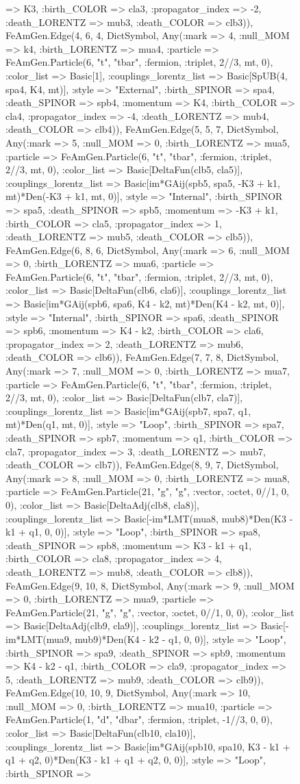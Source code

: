\documentclass{revtex4}
\begin{document}
\begin{figure}[!htb]
\begin{center}
{=> K3, :birth_COLOR => cla3, :propagator_index => -2, :death_LORENTZ => mub3, :death_COLOR => clb3)), FeAmGen.Edge(4, 6, 4, Dict{Symbol, Any}(:mark => 4, :null_MOM => k4, :birth_LORENTZ => mua4, :particle => FeAmGen.Particle(6, "t", "tbar", :fermion, :triplet, 2//3, mt, 0), :color_list => Basic[1], :couplings_lorentz_list => Basic[SpUB(4, spa4, K4, mt)], :style => "External", :birth_SPINOR => spa4, :death_SPINOR => spb4, :momentum => K4, :birth_COLOR => cla4, :propagator_index => -4, :death_LORENTZ => mub4, :death_COLOR => clb4)), FeAmGen.Edge(5, 5, 7, Dict{Symbol, Any}(:mark => 5, :null_MOM => 0, :birth_LORENTZ => mua5, :particle => FeAmGen.Particle(6, "t", "tbar", :fermion, :triplet, 2//3, mt, 0), :color_list => Basic[DeltaFun(clb5, cla5)], :couplings_lorentz_list => Basic[im*GAij(spb5, spa5, -K3 + k1, mt)*Den(-K3 + k1, mt, 0)], :style => "Internal", :birth_SPINOR => spa5, :death_SPINOR => spb5, :momentum => -K3 + k1, :birth_COLOR => cla5, :propagator_index => 1, :death_LORENTZ => mub5, :death_COLOR => clb5)), FeAmGen.Edge(6, 8, 6, Dict{Symbol, Any}(:mark => 6, :null_MOM => 0, :birth_LORENTZ => mua6, :particle => FeAmGen.Particle(6, "t", "tbar", :fermion, :triplet, 2//3, mt, 0), :color_list => Basic[DeltaFun(clb6, cla6)], :couplings_lorentz_list => Basic[im*GAij(spb6, spa6, K4 - k2, mt)*Den(K4 - k2, mt, 0)], :style => "Internal", :birth_SPINOR => spa6, :death_SPINOR => spb6, :momentum => K4 - k2, :birth_COLOR => cla6, :propagator_index => 2, :death_LORENTZ => mub6, :death_COLOR => clb6)), FeAmGen.Edge(7, 7, 8, Dict{Symbol, Any}(:mark => 7, :null_MOM => 0, :birth_LORENTZ => mua7, :particle => FeAmGen.Particle(6, "t", "tbar", :fermion, :triplet, 2//3, mt, 0), :color_list => Basic[DeltaFun(clb7, cla7)], :couplings_lorentz_list => Basic[im*GAij(spb7, spa7, q1, mt)*Den(q1, mt, 0)], :style => "Loop", :birth_SPINOR => spa7, :death_SPINOR => spb7, :momentum => q1, :birth_COLOR => cla7, :propagator_index => 3, :death_LORENTZ => mub7, :death_COLOR => clb7)), FeAmGen.Edge(8, 9, 7, Dict{Symbol, Any}(:mark => 8, :null_MOM => 0, :birth_LORENTZ => mua8, :particle => FeAmGen.Particle(21, "g", "g", :vector, :octet, 0//1, 0, 0), :color_list => Basic[DeltaAdj(clb8, cla8)], :couplings_lorentz_list => Basic[-im*LMT(mua8, mub8)*Den(K3 - k1 + q1, 0, 0)], :style => "Loop", :birth_SPINOR => spa8, :death_SPINOR => spb8, :momentum => K3 - k1 + q1, :birth_COLOR => cla8, :propagator_index => 4, :death_LORENTZ => mub8, :death_COLOR => clb8)), FeAmGen.Edge(9, 10, 8, Dict{Symbol, Any}(:mark => 9, :null_MOM => 0, :birth_LORENTZ => mua9, :particle => FeAmGen.Particle(21, "g", "g", :vector, :octet, 0//1, 0, 0), :color_list => Basic[DeltaAdj(clb9, cla9)], :couplings_lorentz_list => Basic[-im*LMT(mua9, mub9)*Den(K4 - k2 - q1, 0, 0)], :style => "Loop", :birth_SPINOR => spa9, :death_SPINOR => spb9, :momentum => K4 - k2 - q1, :birth_COLOR => cla9, :propagator_index => 5, :death_LORENTZ => mub9, :death_COLOR => clb9)), FeAmGen.Edge(10, 10, 9, Dict{Symbol, Any}(:mark => 10, :null_MOM => 0, :birth_LORENTZ => mua10, :particle => FeAmGen.Particle(1, "d", "dbar", :fermion, :triplet, -1//3, 0, 0), :color_list => Basic[DeltaFun(clb10, cla10)], :couplings_lorentz_list => Basic[im*GAij(spb10, spa10, K3 - k1 + q1 + q2, 0)*Den(K3 - k1 + q1 + q2, 0, 0)], :style => "Loop", :birth_SPINOR => }
\end{center}
\end{figure}
\end{document}
